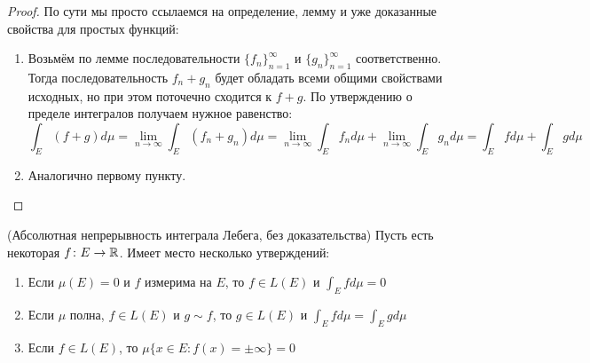 \begin{proof}
	По сути мы просто ссылаемся на определение, лемму и уже доказанные свойства для простых функций:
	\begin{enumerate}
		\item Возьмём по лемме последовательности $\{f_n\}_{n = 1}^\infty$ и $\{g_n\}_{n = 1}^\infty$ соответственно. Тогда последовательность $f_n + g_n$ будет обладать всеми общими свойствами исходных, но при этом поточечно сходится к $f + g$. По утверждению о пределе интегралов получаем нужное равенство:
		\[
			\int_E (f + g)d\mu = \lim_{n \to \infty} \int_E (f_n + g_n)d\mu = \lim_{n \to \infty} \int_E f_nd\mu + \lim_{n \to \infty} \int_E g_nd\mu = \int_E fd\mu + \int_E gd\mu
		\]
		
		\item Аналогично первому пункту.
	\end{enumerate}
\end{proof}

\begin{theorem} (Абсолютная непрерывность интеграла Лебега, без доказательства)
	Пусть есть некоторая $f \colon E \to \mathbb{R}$. Имеет место несколько утверждений:
	\begin{enumerate}
		\item Если $\mu(E) = 0$ и $f$ измерима на $E$, то $f \in L(E)$ и $\int_E fd\mu = 0$
		
		\item Если $\mu$ полна, $f \in L(E)$ и $g \sim f$, то $g \in L(E)$ и $\int_E fd\mu = \int_E gd\mu$
		
		\item Если $f \in L(E)$, то $\mu\{x \in E \colon f(x) = \pm \infty\} = 0$
	\end{enumerate}
\end{theorem}


